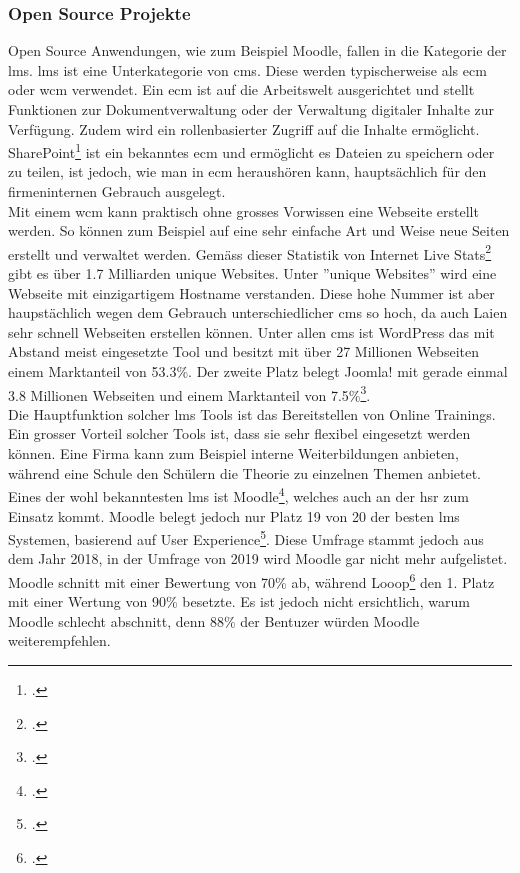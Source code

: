 \subsubsection*{Open Source Projekte}
Open Source Anwendungen, wie zum Beispiel Moodle, fallen in die Kategorie der \gls{lms}. \gls{lms} ist eine Unterkategorie von \gls{cms}. Diese werden typischerweise als \gls{ecm} oder \gls{wcm} verwendet. Ein \gls{ecm} ist auf die Arbeitswelt ausgerichtet und stellt Funktionen zur Dokumentverwaltung oder der Verwaltung digitaler Inhalte zur Verfügung. Zudem wird ein rollenbasierter Zugriff auf die Inhalte ermöglicht. SharePoint\footcite{sharepoint} ist ein bekanntes \gls{ecm} und ermöglicht es Dateien zu speichern oder zu teilen, ist jedoch, wie man in \gls{ecm} heraushören kann, hauptsächlich für den firmeninternen Gebrauch ausgelegt. \\

Mit einem \gls{wcm} kann praktisch ohne grosses Vorwissen eine Webseite erstellt werden. So können zum Beispiel auf eine sehr einfache Art und Weise neue Seiten erstellt und verwaltet werden. Gemäss dieser Statistik von Internet Live Stats\footcite{internet_live_stats} gibt es über 1.7 Milliarden unique Websites. Unter ''unique Websites'' wird eine Webseite mit einzigartigem Hostname verstanden. Diese hohe Nummer ist aber haupstächlich wegen dem Gebrauch unterschiedlicher \gls{cms} so hoch, da auch Laien sehr schnell Webseiten erstellen können. Unter allen \gls{cms} ist WordPress das mit Abstand meist eingesetzte Tool und besitzt mit über 27 Millionen Webseiten einem Marktanteil von 53.3\%. Der zweite Platz belegt Joomla! mit gerade einmal 3.8 Millionen Webseiten und einem Marktanteil von 7.5\%\footcite{cms_market_share}.\\

Die Hauptfunktion solcher \gls{lms} Tools ist das Bereitstellen von Online Trainings. Ein grosser Vorteil solcher Tools ist, dass sie sehr flexibel eingesetzt werden können. Eine Firma kann zum Beispiel interne Weiterbildungen anbieten, während eine Schule den Schülern die Theorie zu einzelnen Themen anbietet. \\

Eines der wohl bekanntesten \gls{lms} ist Moodle\footcite{moodle_homepage}, welches auch an der \gls{hsr} zum Einsatz kommt. Moodle belegt jedoch nur Platz 19 von 20 der besten \gls{lms} Systemen, basierend auf User Experience\footcite{moodle_ux}. Diese Umfrage stammt jedoch aus dem Jahr 2018, in der Umfrage von 2019 wird Moodle gar nicht mehr aufgelistet. Moodle schnitt mit einer Bewertung von 70\% ab, während Looop\footcite{looop_homepage} den 1. Platz mit einer Wertung von 90\% besetzte. Es ist jedoch nicht ersichtlich, warum Moodle schlecht abschnitt, denn 88\% der Bentuzer würden Moodle weiterempfehlen.


